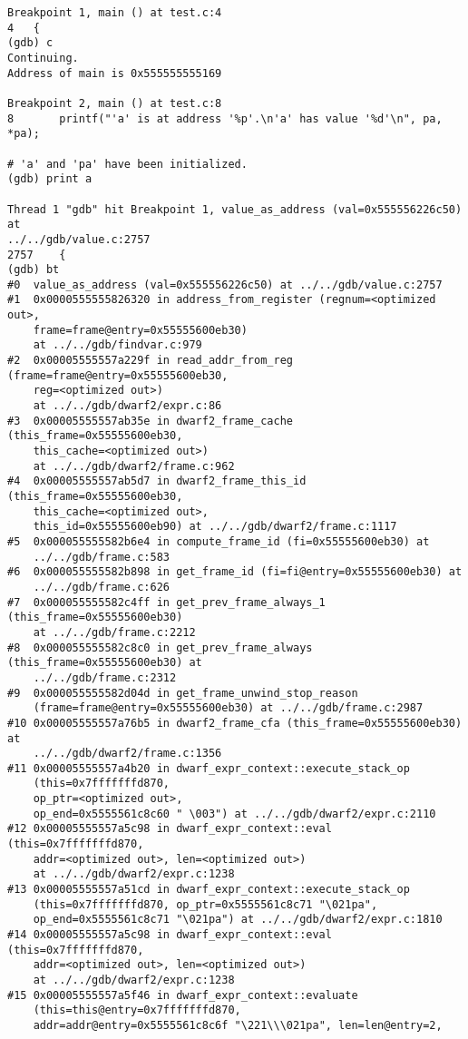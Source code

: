 \documentclass{report}
\begin{document}
\begin{verbatim}
Breakpoint 1, main () at test.c:4
4	{
(gdb) c
Continuing.
Address of main is 0x555555555169

Breakpoint 2, main () at test.c:8
8		printf("'a' is at address '%p'.\n'a' has value '%d'\n", pa, *pa);

# 'a' and 'pa' have been initialized.
(gdb) print a

Thread 1 "gdb" hit Breakpoint 1, value_as_address (val=0x555556226c50) at 
../../gdb/value.c:2757
2757	{
(gdb) bt
#0  value_as_address (val=0x555556226c50) at ../../gdb/value.c:2757
#1  0x0000555555826320 in address_from_register (regnum=<optimized out>, 
    frame=frame@entry=0x55555600eb30)
    at ../../gdb/findvar.c:979
#2  0x00005555557a229f in read_addr_from_reg (frame=frame@entry=0x55555600eb30,
    reg=<optimized out>)
    at ../../gdb/dwarf2/expr.c:86
#3  0x00005555557ab35e in dwarf2_frame_cache (this_frame=0x55555600eb30, 
    this_cache=<optimized out>)
    at ../../gdb/dwarf2/frame.c:962
#4  0x00005555557ab5d7 in dwarf2_frame_this_id (this_frame=0x55555600eb30, 
    this_cache=<optimized out>, 
    this_id=0x55555600eb90) at ../../gdb/dwarf2/frame.c:1117
#5  0x000055555582b6e4 in compute_frame_id (fi=0x55555600eb30) at 
    ../../gdb/frame.c:583
#6  0x000055555582b898 in get_frame_id (fi=fi@entry=0x55555600eb30) at 
    ../../gdb/frame.c:626
#7  0x000055555582c4ff in get_prev_frame_always_1 (this_frame=0x55555600eb30)
    at ../../gdb/frame.c:2212
#8  0x000055555582c8c0 in get_prev_frame_always (this_frame=0x55555600eb30) at
    ../../gdb/frame.c:2312
#9  0x000055555582d04d in get_frame_unwind_stop_reason 
    (frame=frame@entry=0x55555600eb30) at ../../gdb/frame.c:2987
#10 0x00005555557a76b5 in dwarf2_frame_cfa (this_frame=0x55555600eb30) at 
    ../../gdb/dwarf2/frame.c:1356
#11 0x00005555557a4b20 in dwarf_expr_context::execute_stack_op 
    (this=0x7fffffffd870, 
    op_ptr=<optimized out>, 
    op_end=0x5555561c8c60 " \003") at ../../gdb/dwarf2/expr.c:2110
#12 0x00005555557a5c98 in dwarf_expr_context::eval (this=0x7fffffffd870, 
    addr=<optimized out>, len=<optimized out>)
    at ../../gdb/dwarf2/expr.c:1238
#13 0x00005555557a51cd in dwarf_expr_context::execute_stack_op 
    (this=0x7fffffffd870, op_ptr=0x5555561c8c71 "\021pa", 
    op_end=0x5555561c8c71 "\021pa") at ../../gdb/dwarf2/expr.c:1810
#14 0x00005555557a5c98 in dwarf_expr_context::eval (this=0x7fffffffd870, 
    addr=<optimized out>, len=<optimized out>)
    at ../../gdb/dwarf2/expr.c:1238
#15 0x00005555557a5f46 in dwarf_expr_context::evaluate 
    (this=this@entry=0x7fffffffd870, 
    addr=addr@entry=0x5555561c8c6f "\221\\\021pa", len=len@entry=2, 

\end{verbatim}
\end{document}
